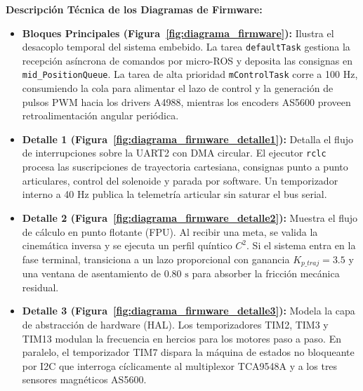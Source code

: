 \documentclass[12pt, a4paper]{report}
\begin{document}
\textbf{Descripción Técnica de los Diagramas de Firmware:}
\begin{itemize}
    \item \textbf{Bloques Principales (Figura~\ref{fig:diagrama_firmware}):} Ilustra el desacoplo temporal del sistema embebido. La tarea \texttt{defaultTask} gestiona la recepción asíncrona de comandos por micro-ROS y deposita las consignas en \texttt{mid\_PositionQueue}. La tarea de alta prioridad \texttt{mControlTask} corre a 100 Hz, consumiendo la cola para alimentar el lazo de control y la generación de pulsos PWM hacia los drivers A4988, mientras los encoders AS5600 proveen retroalimentación angular periódica.
    \item \textbf{Detalle 1 (Figura~\ref{fig:diagrama_firmware_detalle1}):} Detalla el flujo de interrupciones sobre la UART2 con DMA circular. El ejecutor \texttt{rclc} procesa las suscripciones de trayectoria cartesiana, consignas punto a punto articulares, control del solenoide y parada por software. Un temporizador interno a 40 Hz publica la telemetría articular sin saturar el bus serial.
    \item \textbf{Detalle 2 (Figura~\ref{fig:diagrama_firmware_detalle2}):} Muestra el flujo de cálculo en punto flotante (FPU). Al recibir una meta, se valida la cinemática inversa y se ejecuta un perfil quíntico $C^2$. Si el sistema entra en la fase terminal, transiciona a un lazo proporcional con ganancia $K_{p\_traj} = 3.5$ y una ventana de asentamiento de $0.80\text{ s}$ para absorber la fricción mecánica residual.
    \item \textbf{Detalle 3 (Figura~\ref{fig:diagrama_firmware_detalle3}):} Modela la capa de abstracción de hardware (HAL). Los temporizadores TIM2, TIM3 y TIM13 modulan la frecuencia en hercios para los motores paso a paso. En paralelo, el temporizador TIM7 dispara la máquina de estados no bloqueante por I2C que interroga cíclicamente al multiplexor TCA9548A y a los tres sensores magnéticos AS5600.
\end{itemize}
\end{document}
